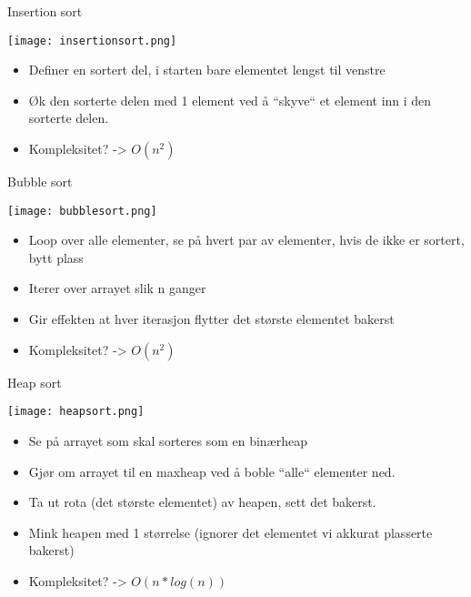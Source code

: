\documentclass[norsk, handout]{beamer}
\begin{document}
    \begin{frame}{Insertion sort}

      \begin{center}
        \texttt{[image: insertionsort.png]} 
      \end{center}
      \begin{itemize}
          \item Definer en sortert del, i starten bare elementet lengst til venstre
          \item Øk den sorterte delen med 1 element ved å ``skyve`` et element inn i den 
            sorterte delen.
          \item Kompleksitet? \pause -> $O(n^2)$
      \end{itemize}
    \end{frame}

    \begin{frame}{Bubble sort}
      \begin{center}
        \texttt{[image: bubblesort.png]} 
      \end{center}
      \begin{itemize}
          \item Loop over alle elementer, se på hvert par av elementer, hvis de ikke er 
            sortert, bytt plass
          \item Iterer over arrayet slik n ganger
          \item Gir effekten at hver iterasjon flytter det største elementet bakerst
          \item Kompleksitet? \pause -> $O(n^2)$
      \end{itemize}
    \end{frame}

    \begin{frame}{Heap sort}
      \begin{center}
        \texttt{[image: heapsort.png]} 
      \end{center}
      \begin{itemize}
          \item Se på arrayet som skal sorteres som en binærheap
          \item Gjør om arrayet til en maxheap ved å boble ``alle`` elementer ned.
          \item Ta ut rota (det største elementet) av heapen, sett det bakerst.
          \item Mink heapen med 1 størrelse (ignorer det elementet vi akkurat plasserte bakerst)
          \item Kompleksitet? \pause -> $O(n*log(n))$
      \end{itemize}
    \end{frame}
\end{document}
